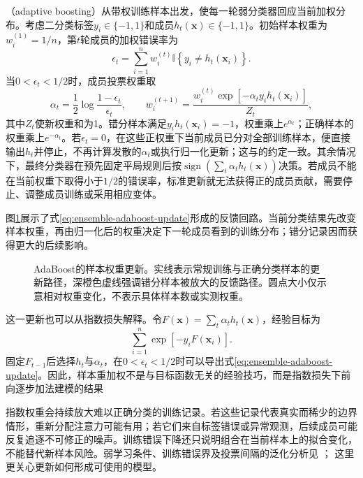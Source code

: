 （adaptive boosting）从带权训练样本出发，使每一轮弱分类器回应当前加权分布。考虑二分类标签$y_i\in\{-1,1\}$和成员$h_t(\bm{x})\in\{-1,1\}$。初始样本权重为$w_i^{(1)}=1/n$，第$t$轮成员的加权错误率为
\begin{equation}
  \epsilon_t
  =
  \sum_{i=1}^{n}
  w_i^{(t)}
  \mathbb{I}\!\left\{y_i\neq h_t(\bm{x}_i)\right\}.
  \label{eq:ensemble-adaboost-error}
\end{equation}
当$0<\epsilon_t<1/2$时，成员投票权重取
\begin{equation}
  \alpha_t
  =
  \frac{1}{2}
  \log\frac{1-\epsilon_t}{\epsilon_t},
  \qquad
  w_i^{(t+1)}
  =
  \frac{
    w_i^{(t)}
    \exp\!\left[-\alpha_t y_i h_t(\bm{x}_i)\right]
  }{Z_t},
  \label{eq:ensemble-adaboost-update}
\end{equation}
其中$Z_t$使新权重和为1。错分样本满足$y_i h_t(\bm{x}_i)=-1$，权重乘上$e^{\alpha_t}$；正确样本的权重乘上$e^{-\alpha_t}$。若$\epsilon_t=0$，在这些正权重下当前成员已分对全部训练样本，便直接输出$h_t$并停止，不再计算发散的$\alpha_t$或执行归一化更新；这与的约定一致。其余情况下，最终分类器在预先固定平局规则后按$\operatorname{sign}(\sum_t\alpha_t h_t(\bm{x}))$决策。若成员不能在当前权重下取得小于$1/2$的错误率，标准更新就无法获得正的成员贡献，需要停止、调整成员训练或采用相应变体。

图\ref{fig:ensemble-adaboost-weight-update}展示了式\eqref{eq:ensemble-adaboost-update}形成的反馈回路。当前分类结果先改变样本权重，再由归一化后的权重决定下一轮成员看到的训练分布；错分记录因而获得更大的后续影响。

\begin{figure}[htbp]
  \centering
  
  \caption{AdaBoost的样本权重更新。实线表示常规训练与正确分类样本的更新路径，深橙色虚线强调错分样本被放大的反馈路径。圆点大小仅示意相对权重变化，不表示具体样本数或实测权重。}
  \label{fig:ensemble-adaboost-weight-update}
\end{figure}

这一更新也可以从指数损失解释。令$F(\bm{x})=\sum_t\alpha_t h_t(\bm{x})$，经验目标为
\[
  \sum_{i=1}^{n}\exp\!\left[-y_iF(\bm{x}_i)\right].
\]
固定$F_{t-1}$后选择$h_t$与$\alpha_t$，在$0<\epsilon_t<1/2$时可以导出式\eqref{eq:ensemble-adaboost-update}。因此，样本重加权不是与目标函数无关的经验技巧，而是指数损失下前向逐步加法建模的结果

指数权重会持续放大难以正确分类的训练记录。若这些记录代表真实而稀少的边界情形，重新分配注意力可能有用；若它们来自标签错误或异常观测，后续成员可能反复追逐不可修正的噪声。训练错误下降还只说明组合在当前样本上的拟合变化，不能替代新样本风险。弱学习条件、训练错误界及投票间隔的泛化分析见
；
这里更关心更新如何形成可使用的模型。


